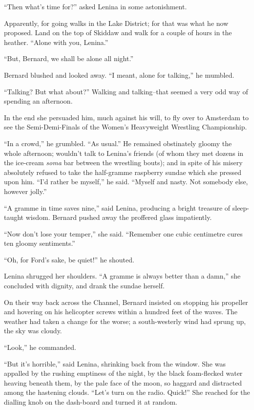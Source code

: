 \documentclass[12pt]{report}
\begin{document}
``Then what's time for?'' asked Lenina in some astonishment.

Apparently, for going walks in the Lake District; for that was what he
now proposed. Land on the top of Skiddaw and walk for a couple of hours
in the heather. ``Alone with you, Lenina.''

``But, Bernard, we shall be alone all night.''

Bernard blushed and looked away. ``I meant, alone for talking,'' he
mumbled.

``Talking? But what about?'' Walking and talking--that seemed a very odd
way of spending an afternoon.

In the end she persuaded him, much against his will, to fly over to
Amsterdam to see the Semi-Demi-Finals of the Women's Heavyweight
Wrestling Championship.

``In a crowd,'' he grumbled. ``As usual.'' He remained obstinately
gloomy the whole afternoon; wouldn't talk to Lenina's friends (of whom
they met dozens in the ice-cream \emph{soma} bar between the wrestling
bouts); and in spite of his misery absolutely refused to take the
half-gramme raspberry sundae which she pressed upon him. ``I'd rather be
myself,'' he said. ``Myself and nasty. Not somebody else, however
jolly.''

``A gramme in time saves nine,'' said Lenina, producing a bright
treasure of sleep-taught wisdom. Bernard pushed away the proffered glass
impatiently.

``Now don't lose your temper,'' she said. ``Remember one cubic
centimetre cures ten gloomy sentiments.''

``Oh, for Ford's sake, be quiet!'' he shouted.

Lenina shrugged her shoulders. ``A gramme is always better than a
damn,'' she concluded with dignity, and drank the sundae herself.

On their way back across the Channel, Bernard insisted on stopping his
propeller and hovering on his helicopter screws within a hundred feet of
the waves. The weather had taken a change for the worse; a
south-westerly wind had sprung up, the sky was cloudy.

``Look,'' he commanded.

``But it's horrible,'' said Lenina, shrinking back from the window. She
was appalled by the rushing emptiness of the night, by the black
foam-flecked water heaving beneath them, by the pale face of the moon,
so haggard and distracted among the hastening clouds. ``Let's turn on
the radio. Quick!'' She reached for the dialling knob on the dash-board
and turned it at random.
\end{document}
